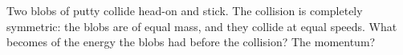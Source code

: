 Two blobs of putty collide head-on and stick. The collision is completely symmetric: the blobs are
of equal mass, and they collide at equal speeds. What becomes of the energy the blobs
had before the collision? The momentum?
